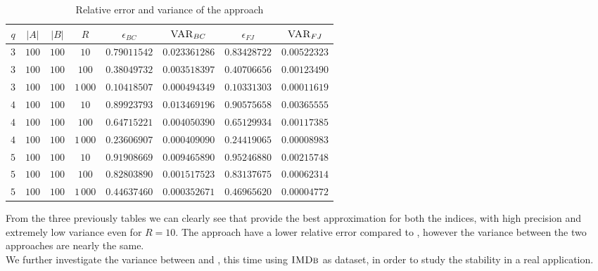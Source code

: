 \begin{table}[h]
	\centering
	\label{my-label}
	\begin{tabular}{|c|c|c|c|c|c|c|c|}
		\hline
		$q$ & $|A|$ & $|B|$ & $R$      & $\epsilon_{BC}$ & $\textsc{VAR}_{BC}$ & $\epsilon_{FJ}$ & $\textsc{VAR}_{FJ}$ \\ \hline 
		$3$ & $100$ & $100$ & $10$     & $0.79011542$ & $0.023361286$ & $0.83428722$ & $0.00522323$ \\ \hline
		$3$ & $100$ & $100$ & $100$    & $0.38049732$ & $0.003518397$ & $0.40706656$ & $0.00123490$ \\ \hline
		$3$ & $100$ & $100$ & $1\,000$ & $0.10418507$ & $0.000494349$ & $0.10331303$ & $0.00011619$ \\ \hline
		$4$ & $100$ & $100$ & $10$     & $0.89923793$ & $0.013469196$ & $0.90575658$ & $0.00365555$ \\ \hline
		$4$ & $100$ & $100$ & $100$    & $0.64715221$ & $0.004050390$ & $0.65129934$ & $0.00117385$ \\ \hline
		$4$ & $100$ & $100$ & $1\,000$ & $0.23606907$ & $0.000409090$ & $0.24419065$ & $0.00008983$ \\ \hline
		$5$ & $100$ & $100$ & $10$     & $0.91908669$ & $0.009465890$ & $0.95246880$ & $0.00215748$ \\ \hline
		$5$ & $100$ & $100$ & $100$    & $0.82803890$ & $0.001517523$ & $0.83137675$ & $0.00062314$ \\ \hline
		$5$ & $100$ & $100$ & $1\,000$ & $0.44637460$ & $0.000352671$ & $0.46965620$ & $0.00004772$ \\ \hline
	\end{tabular}
	\caption{Relative error and variance of the \base approach}	
\end{table}
		
		\clearpage
		
		From the three previously tables we can clearly see that \fcount provide the best approximation for both the indices, 
		with high precision and extremely low variance even for $R=10$. 
		The \fsamp approach have a lower relative error compared to \base, however the variance between the two approaches are nearly the same.\\ 
		
		We further investigate the variance between \fsamp and \base, this time using $\textsc{IMDb}$ as dataset,
		in order to study the stability in a real application.
				
